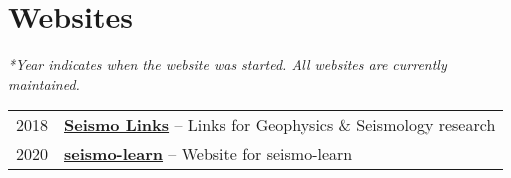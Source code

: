 \section*{Websites}

\textit{*Year indicates when the website was started. All websites are currently maintained.}

\begin{tabular}{p{} p{}}
2018 &	\textbf{\href{https://seismo-learn.org/links/}{Seismo Links}} -- Links for Geophysics \& Seismology research \\
2020 &	\textbf{\href{https://seismo-learn.org/}{seismo-learn}} -- Website for seismo-learn \\
\end{tabular}
